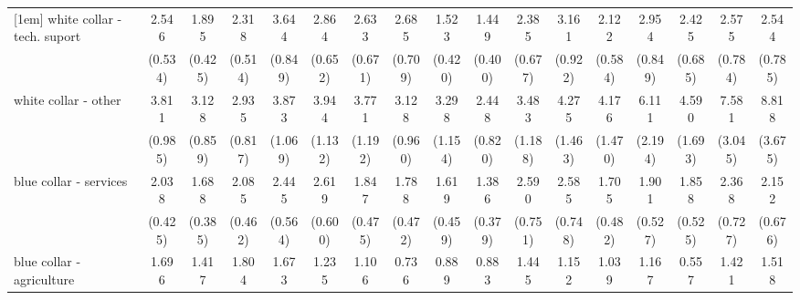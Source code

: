 {\begin{tabular}{l*{16}{c}}
[1em]
white collar - tech. suport&       2.546\sym{***}&       1.895\sym{**} &       2.318\sym{***}&       3.644\sym{***}&       2.864\sym{***}&       2.633\sym{***}&       2.685\sym{***}&       1.523         &       1.449         &       2.385\sym{**} &       3.161\sym{***}&       2.122\sym{**} &       2.954\sym{***}&       2.425\sym{**} &       2.575\sym{**} &       2.544\sym{**} \\
                    &     (0.534)         &     (0.425)         &     (0.514)         &     (0.849)         &     (0.652)         &     (0.671)         &     (0.709)         &     (0.420)         &     (0.400)         &     (0.677)         &     (0.922)         &     (0.584)         &     (0.849)         &     (0.685)         &     (0.784)         &     (0.785)         \\
[1em]
white collar - other&       3.811\sym{***}&       3.128\sym{***}&       2.935\sym{***}&       3.873\sym{***}&       3.944\sym{***}&       3.771\sym{***}&       3.128\sym{***}&       3.298\sym{***}&       2.448\sym{**} &       3.483\sym{***}&       4.275\sym{***}&       4.176\sym{***}&       6.111\sym{***}&       4.590\sym{***}&       7.581\sym{***}&       8.818\sym{***}\\
                    &     (0.985)         &     (0.859)         &     (0.817)         &     (1.069)         &     (1.132)         &     (1.192)         &     (0.960)         &     (1.154)         &     (0.820)         &     (1.188)         &     (1.463)         &     (1.470)         &     (2.194)         &     (1.693)         &     (3.045)         &     (3.675)         \\
[1em]
blue collar - services&       2.038\sym{***}&       1.688\sym{*}  &       2.085\sym{***}&       2.445\sym{***}&       2.619\sym{***}&       1.847\sym{*}  &       1.788\sym{*}  &       1.619         &       1.386         &       2.590\sym{**} &       2.585\sym{**} &       1.705         &       1.901\sym{*}  &       1.858\sym{*}  &       2.368\sym{**} &       2.152\sym{*}  \\
                    &     (0.425)         &     (0.385)         &     (0.462)         &     (0.564)         &     (0.600)         &     (0.475)         &     (0.472)         &     (0.459)         &     (0.379)         &     (0.751)         &     (0.748)         &     (0.482)         &     (0.527)         &     (0.525)         &     (0.727)         &     (0.676)         \\
[1em]
blue collar - agriculture&       1.696         &       1.417         &       1.804         &       1.673         &       1.235         &       1.106         &       0.736         &       0.889         &       0.883         &       1.445         &       1.152         &       1.039         &       1.167         &       0.557         &       1.421         &       1.518         \\

\end{tabular}}
